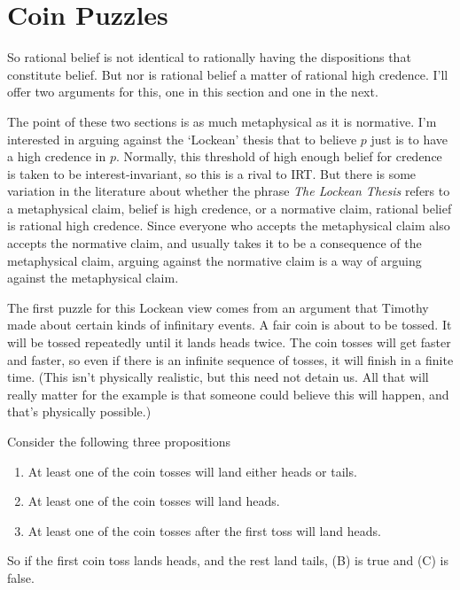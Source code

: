 \documentclass[11pt,]{book}
\providecommand{\tightlist}{%
  \setlength{\itemsep}{0pt}\setlength{\parskip}{0pt}}
\begin{document}
\hypertarget{lockecoin}{%
\section{Coin Puzzles}\label{lockecoin}}

So rational belief is not identical to rationally having the dispositions that constitute belief. But nor is rational belief a matter of rational high credence. I'll offer two arguments for this, one in this section and one in the next.

The point of these two sections is as much metaphysical as it is normative. I'm interested in arguing against the `Lockean' thesis that to believe \(p\) just is to have a high credence in \(p\). Normally, this threshold of high enough belief for credence is taken to be interest-invariant, so this is a rival to IRT. But there is some variation in the literature about whether the phrase \emph{The Lockean Thesis} refers to a metaphysical claim, belief is high credence, or a normative claim, rational belief is rational high credence. Since everyone who accepts the metaphysical claim also accepts the normative claim, and usually takes it to be a consequence of the metaphysical claim, arguing against the normative claim is a way of arguing against the metaphysical claim.

The first puzzle for this Lockean view comes from an argument that Timothy \citet{Williamson2007} made about certain kinds of infinitary events. A fair coin is about to be tossed. It will be tossed repeatedly until it lands heads twice. The coin tosses will get faster and faster, so even if there is an infinite sequence of tosses, it will finish in a finite time. (This isn't physically realistic, but this need not detain us. All that will really matter for the example is that someone could believe this will happen, and that's physically possible.)

Consider the following three propositions

\begin{enumerate}
\def\labelenumi{(\Alph{enumi})}
\tightlist
\item
  At least one of the coin tosses will land either heads or tails.
\item
  At least one of the coin tosses will land heads.
\item
  At least one of the coin tosses after the first toss will land heads.
\end{enumerate}

So if the first coin toss lands heads, and the rest land tails, (B) is true and (C) is false.
\end{document}
